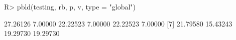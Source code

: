 \begin{Schunk}
% --begin: "pbld6"
\begin{Sinput}
R> pbld(testing, rb, p, v, type = "global")
\end{Sinput}
\begin{Soutput}
 [1] 27.26126  7.00000 22.22523  7.00000 22.22523  7.00000
 [7] 21.79580 15.43243 19.29730 19.29730
\end{Soutput}
%
% --end: "pbld6"
\end{Schunk}
